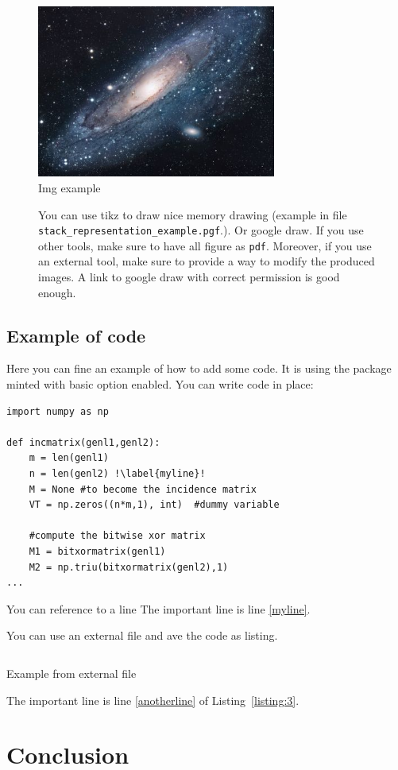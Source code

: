 \documentclass{article}
\begin{document}
\begin{figure}[tbh]
\centering
\includegraphics[width=0.7\textwidth]{images/universe.jpg}
\caption{Img example}
\label{fig:universe}
\end{figure}
\begin{figure}[tbh]
    \centering
    
     \caption{You can use tikz to draw nice memory drawing (example in file \texttt{stack\_representation\_example.pgf}.). Or google draw.  If you use other tools, make sure to have all figure as \texttt{pdf}. Moreover, if you use an external tool, make sure to provide a way to modify the produced images. A link to google draw with correct permission is good enough.}
    \label{general-stolen-api}
    \end{figure} 

\subsection{Example of code}
Here you can fine an example of how to add some code. It is using the package minted with basic option enabled.
You can write code in place:
\begin{verbatim}
import numpy as np
    
def incmatrix(genl1,genl2):
    m = len(genl1)
    n = len(genl2) !\label{myline}!
    M = None #to become the incidence matrix
    VT = np.zeros((n*m,1), int)  #dummy variable
    
    #compute the bitwise xor matrix
    M1 = bitxormatrix(genl1)
    M2 = np.triu(bitxormatrix(genl2),1) 
...
\end{verbatim}
You can reference to a line
The important line is line \ref{myline}.

You can use an external file and ave the code as listing.
\begin{listing}[ht]
\inputminted[linenos, bgcolor=black, escapeinside=!!]{python}{x.py}
\caption{Example from external file}
\label{listing:3}
\end{listing}
 
The important line is line \ref{anotherline} of Listing~\ref{listing:3}.

\section{Conclusion}




\end{document}
